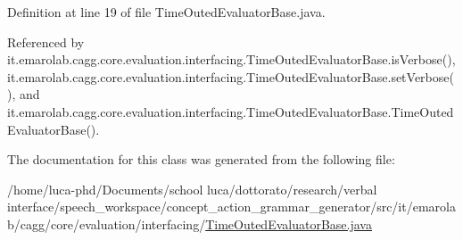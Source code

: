 Definition at line 19 of file Time\-Outed\-Evaluator\-Base.\-java.



Referenced by it.\-emarolab.\-cagg.\-core.\-evaluation.\-interfacing.\-Time\-Outed\-Evaluator\-Base.\-is\-Verbose(), it.\-emarolab.\-cagg.\-core.\-evaluation.\-interfacing.\-Time\-Outed\-Evaluator\-Base.\-set\-Verbose(), and it.\-emarolab.\-cagg.\-core.\-evaluation.\-interfacing.\-Time\-Outed\-Evaluator\-Base.\-Time\-Outed\-Evaluator\-Base().



The documentation for this class was generated from the following file\-:\begin{DoxyCompactItemize}
\item 
/home/luca-\/phd/\-Documents/school luca/dottorato/research/verbal interface/speech\-\_\-workspace/concept\-\_\-action\-\_\-grammar\-\_\-generator/src/it/emarolab/cagg/core/evaluation/interfacing/\hyperlink{TimeOutedEvaluatorBase_8java}{Time\-Outed\-Evaluator\-Base.\-java}\end{DoxyCompactItemize}
